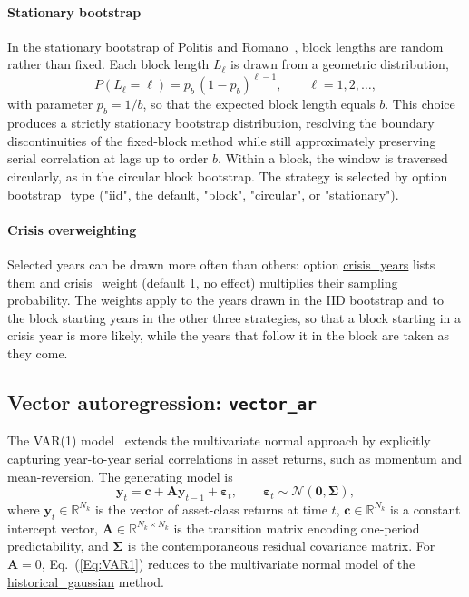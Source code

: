 \documentclass[fleqn,12pt]{report}
\newcommand{\code}[1]{\url{#1}}
\begin{document}
\paragraph*{Stationary bootstrap}
In the stationary bootstrap of Politis and Romano~\cite{politisromano1994},
block lengths are random rather than fixed.
Each block length $L_\ell$ is drawn from a geometric distribution,
\begin{equation}
    P(L_\ell = \ell) = p_b\,(1-p_b)^{\ell-1},
    \qquad \ell = 1, 2, \ldots,
\end{equation}
with parameter $p_b = 1/b$, so that the expected block length equals $b$.
This choice produces a strictly stationary bootstrap distribution, resolving
the boundary discontinuities of the fixed-block method while still
approximately preserving serial correlation at lags up to order $b$.
Within a block, the window is traversed circularly, as in the circular block bootstrap.
The strategy is selected by option \code{bootstrap_type}
(\code{"iid"}, the default, \code{"block"}, \code{"circular"}, or \code{"stationary"}).

\paragraph*{Crisis overweighting}
Selected years can be drawn more often than others:
option \code{crisis_years} lists them and \code{crisis_weight} (default 1, no effect)
multiplies their sampling probability.
The weights apply to the years drawn in the IID bootstrap and to the block starting years in
the other three strategies, so that a block starting in a crisis year is more likely, while
the years that follow it in the block are taken as they come.

\subsection{Vector autoregression: \texttt{vector\_ar}}

The VAR(1) model~\cite{campbellviceira2002,lutkepohl2005} extends the
multivariate normal approach by explicitly capturing year-to-year serial
correlations in asset returns, such as momentum and mean-reversion.
The generating model is
\begin{equation}
    \label{Eq:VAR1}
    \bm{y}_t = \mathbf{c} + \mathbf{A}\bm{y}_{t-1} + \bm{\varepsilon}_t,
    \qquad \bm{\varepsilon}_t \sim \mathcal{N}(\mathbf{0}, \bm{\Sigma}),
\end{equation}
where $\bm{y}_t \in \mathbb{R}^{N_k}$ is the vector of asset-class returns at
time $t$, $\mathbf{c} \in \mathbb{R}^{N_k}$ is a constant intercept vector,
$\mathbf{A} \in \mathbb{R}^{N_k \times N_k}$ is the transition matrix encoding
one-period predictability, and $\bm{\Sigma}$ is the contemporaneous residual
covariance matrix.
For $\mathbf{A} = 0$, Eq.~(\ref{Eq:VAR1}) reduces to the multivariate normal
model of the \code{historical_gaussian} method.
\end{document}

